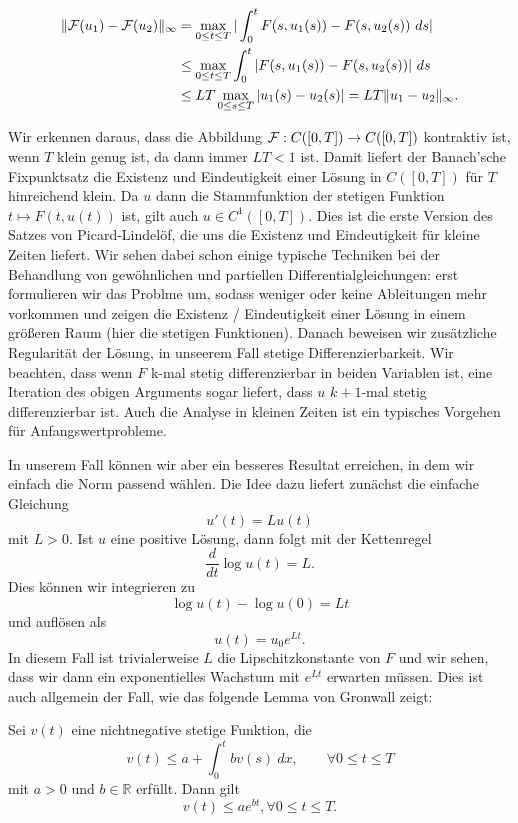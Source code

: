 \begin{align*} 
\Vert {\cal F}(u_1) - {\cal F}(u_2) \Vert_\infty &= \max_{0 \leq t \leq T} \vert \int_0^t F(s,u_1(s)) - F(s,u_2(s)) ~ds \vert \\
&\leq  \max_{0 \leq t \leq T} \int_0^t \vert  F(s,u_1(s)) - F(s,u_2(s))\vert  ~ds  \\ &\leq  L T  \max_{0 \leq s \leq T} \vert u_1(s) - u_2(s) \vert = L T \Vert u_1 - u_2 \Vert_\infty. 
\end{align*}

Wir erkennen daraus, dass die Abbildung ${\cal F}:C([0,T]) \rightarrow C([0,T])$ kontraktiv ist, wenn $T$ klein genug ist, da dann immer $L T < 1 $ ist. Damit liefert der Banach'sche Fixpunktsatz die Existenz und Eindeutigkeit einer Lösung in $C([0,T])$ für $T$ hinreichend klein. Da $u$ dann die Stammfunktion der stetigen Funktion $t \mapsto F(t,u(t))$ ist, gilt auch $u \in C^1([0,T])$.  Dies ist die erste Version des Satzes von Picard-Lindelöf, die uns die Existenz und Eindeutigkeit für kleine Zeiten liefert. Wir sehen dabei schon einige typische Techniken bei der Behandlung von gewöhnlichen und partiellen Differentialgleichungen: erst formulieren wir das Problme um, sodass weniger oder keine Ableitungen mehr vorkommen und zeigen die Existenz / Eindeutigkeit einer Lösung in einem gr{ö}{\ss}eren Raum (hier die stetigen Funktionen). Danach beweisen wir zusätzliche Regularität der Lösung, in unseerem Fall stetige Differenzierbarkeit. Wir beachten, dass wenn $F$ k-mal stetig differenzierbar in beiden Variablen ist, eine Iteration des obigen Arguments sogar liefert, dass $u$ $k+1$-mal stetig differenzierbar ist. Auch die Analyse in kleinen Zeiten ist ein typisches Vorgehen für Anfangswertprobleme. 

In unserem Fall können wir aber ein besseres Resultat erreichen, in dem wir einfach die Norm passend wählen. Die Idee dazu liefert zunächst die einfache Gleichung
$$ u'(t) = L u(t) $$
mit $L > 0$. Ist $u$ eine positive Lösung, dann folgt mit der Kettenregel
$$ \frac{d}{dt} \log u(t) = L. $$
Dies können wir integrieren zu 
$$ \log u(t) - \log u(0) = L t $$
und auflösen als 
$$ u(t) = u_0 e^{Lt}. $$
In diesem Fall ist trivialerweise $L$ die Lipschitzkonstante von $F$ und wir sehen, dass wir dann ein exponentielles Wachstum mit $e^{Lt}$ erwarten müssen. Dies ist auch allgemein der Fall, wie das folgende Lemma von Gronwall zeigt:
 
\begin{lemma}{}{}
Sei $v(t)$ eine nichtnegative stetige Funktion, die 
$$ v(t) \leq a + \int_0^t b v(s)~dx, \qquad \forall 0 \leq t \leq T$$
mit $a > 0$ und $b \in \mathbb{R}$ erfüllt. Dann gilt 
$$ v(t) \leq a e^{bt}, \forall 0 \leq t \leq T.$$
\end{lemma}

